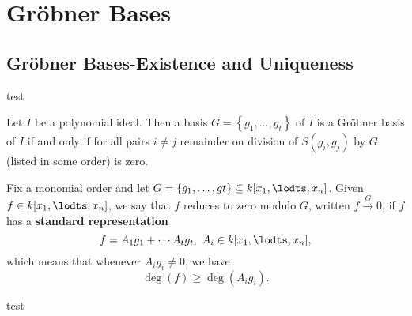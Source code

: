 \chapter{Gr{\"o}bner Bases} 

\section{Gr{\"o}bner Bases-Existence and Uniqueness}

\begin{theorem}
    test
\end{theorem}

\begin{definition}\label{def:Buchberger’s Criterion} %
    Let $I$ be a polynomial ideal. Then a basis
    $ G = \left\{g_1, \ldots , g_t\right\}$ of $I$ is a Gröbner basis of $I$ if and only if for all pairs $i \neq j$
    remainder on division of $S(g_i, g_j)$ by $G$ (listed in some order) is zero.
\end{definition}

\begin{definition}\label{def:reduces_to_zero} %
    Fix a monomial order and let $G = \left\{g_1, \ldots , gt\right\} \subseteq k[x_1, \lodts , x_n]$.
    Given $f \in k[x_1, \lodts , x_n]$, we say that $f$ reduces to zero modulo $G$, written $f \xrightarrow{G} 0$,
    if $f$ has a \textbf{standard representation}
    \[ f = A_1g_1 + \cdots A_tg_t,\ A_i \in k[x_1, \lodts , x_n],\]
    which means that whenever $A_ig_i \neq 0$, we have
    \[\operatorname{deg}(f) ≥ \operatorname{deg}(A_ig_i).\]
\end{definition}

\begin{theorem}
    test
\end{theorem}